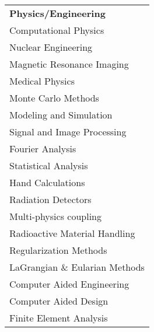 
\begin{minipage}{0.32\textwidth}
\begin{tabular}{l}
	{\large\textbf{Physics/Engineering}} \\
	\highskillbw Computational Physics \\
	\highskillbw Nuclear Engineering \\
	\highskillbw Magnetic Resonance Imaging \\ 
	\highskillbw Medical Physics \\
	\highskillbw Monte Carlo Methods \\
	\highskillbw Modeling and Simulation \\
	\highskillbw Signal and Image Processing \\
	\highskillbw Fourier Analysis \\ 
	\medskillbw Statistical Analysis \\
	\medskillbw Hand Calculations \\
	\medskillbw Radiation Detectors \\
	\medskillbw Multi-physics coupling \\
	\medskillbw Radioactive Material Handling \\
	\medskillbw Regularization Methods  \\
	\medskillbw LaGrangian \& Eularian Methods \\
	\lowskillbw Computer Aided Engineering \\
	\lowskillbw Computer Aided Design \\
	\lowskillbw Finite Element Analysis \\
\end{tabular}
\end{minipage}%
